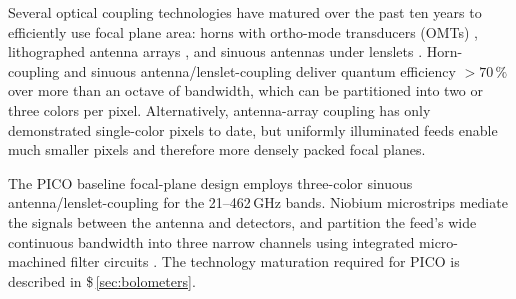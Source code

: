 Several optical coupling technologies have matured over the past ten
years to efficiently use focal plane area: horns with ortho-mode
transducers (OMTs) \citep{Duff2016}, lithographed antenna arrays
\citep{BICEP2015}, and sinuous antennas under lenslets
\citep{Edwards2012}. Horn-coupling and sinuous
antenna/lenslet-coupling deliver quantum efficiency $>70\,\%$ over
more than an octave of bandwidth, which can be partitioned into two
or three colors per pixel.  Alternatively, antenna-array coupling has
only demonstrated single-color pixels to date, but uniformly
illuminated feeds enable much smaller pixels and therefore more
densely packed focal planes.  

%

The PICO baseline focal-plane design
employs three-color sinuous antenna/lenslet-coupling \citep{Suzuki2014}
for the 21--462\,GHz bands. Niobium microstrips mediate the signals
between the antenna and detectors, and partition the feed's wide
continuous bandwidth into three narrow channels using integrated
micro-machined filter circuits \citep{OBrient2013}. The technology
maturation required for PICO is described in \$\,\ref{sec:bolometers}.



